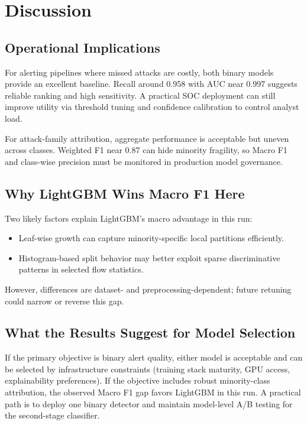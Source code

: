 \documentclass[10pt,journal]{IEEEtran}
\begin{document}
\section{Discussion}
\subsection{Operational Implications}
For alerting pipelines where missed attacks are costly, both binary models provide an excellent baseline. Recall around 0.958 with AUC near 0.997 suggests reliable ranking and high sensitivity. A practical SOC deployment can still improve utility via threshold tuning and confidence calibration to control analyst load.

For attack-family attribution, aggregate performance is acceptable but uneven across classes. Weighted F1 near 0.87 can hide minority fragility, so Macro F1 and class-wise precision must be monitored in production model governance.

\subsection{Why LightGBM Wins Macro F1 Here}
Two likely factors explain LightGBM's macro advantage in this run:
\begin{itemize}
\item Leaf-wise growth can capture minority-specific local partitions efficiently.
\item Histogram-based split behavior may better exploit sparse discriminative patterns in selected flow statistics.
\end{itemize}

However, differences are dataset- and preprocessing-dependent; future retuning could narrow or reverse this gap.

\subsection{What the Results Suggest for Model Selection}
If the primary objective is binary alert quality, either model is acceptable and can be selected by infrastructure constraints (training stack maturity, GPU access, explainability preferences). If the objective includes robust minority-class attribution, the observed Macro F1 gap favors LightGBM in this run. A practical path is to deploy one binary detector and maintain model-level A/B testing for the second-stage classifier.
\end{document}
